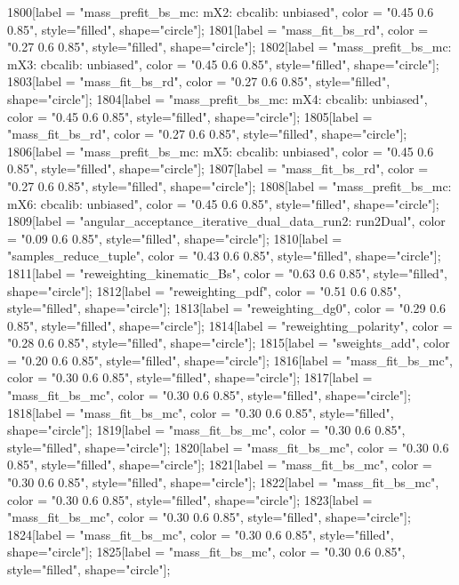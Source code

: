 {	1800[label = "mass_prefit_bs_mc\nmassbin: mX2\nmassmodel: cbcalib\ntrigger: unbiased", color = "0.45 0.6 0.85", style="filled", shape="circle"];
	1801[label = "mass_fit_bs_rd", color = "0.27 0.6 0.85", style="filled", shape="circle"];
	1802[label = "mass_prefit_bs_mc\nmassbin: mX3\nmassmodel: cbcalib\ntrigger: unbiased", color = "0.45 0.6 0.85", style="filled", shape="circle"];
	1803[label = "mass_fit_bs_rd", color = "0.27 0.6 0.85", style="filled", shape="circle"];
	1804[label = "mass_prefit_bs_mc\nmassbin: mX4\nmassmodel: cbcalib\ntrigger: unbiased", color = "0.45 0.6 0.85", style="filled", shape="circle"];
	1805[label = "mass_fit_bs_rd", color = "0.27 0.6 0.85", style="filled", shape="circle"];
	1806[label = "mass_prefit_bs_mc\nmassbin: mX5\nmassmodel: cbcalib\ntrigger: unbiased", color = "0.45 0.6 0.85", style="filled", shape="circle"];
	1807[label = "mass_fit_bs_rd", color = "0.27 0.6 0.85", style="filled", shape="circle"];
	1808[label = "mass_prefit_bs_mc\nmassbin: mX6\nmassmodel: cbcalib\ntrigger: unbiased", color = "0.45 0.6 0.85", style="filled", shape="circle"];
	1809[label = "angular_acceptance_iterative_dual_data_run2\nangacc: run2Dual", color = "0.09 0.6 0.85", style="filled", shape="circle"];
	1810[label = "samples_reduce_tuple", color = "0.43 0.6 0.85", style="filled", shape="circle"];
	1811[label = "reweighting_kinematic_Bs", color = "0.63 0.6 0.85", style="filled", shape="circle"];
	1812[label = "reweighting_pdf", color = "0.51 0.6 0.85", style="filled", shape="circle"];
	1813[label = "reweighting_dg0", color = "0.29 0.6 0.85", style="filled", shape="circle"];
	1814[label = "reweighting_polarity", color = "0.28 0.6 0.85", style="filled", shape="circle"];
	1815[label = "sweights_add", color = "0.20 0.6 0.85", style="filled", shape="circle"];
	1816[label = "mass_fit_bs_mc", color = "0.30 0.6 0.85", style="filled", shape="circle"];
	1817[label = "mass_fit_bs_mc", color = "0.30 0.6 0.85", style="filled", shape="circle"];
	1818[label = "mass_fit_bs_mc", color = "0.30 0.6 0.85", style="filled", shape="circle"];
	1819[label = "mass_fit_bs_mc", color = "0.30 0.6 0.85", style="filled", shape="circle"];
	1820[label = "mass_fit_bs_mc", color = "0.30 0.6 0.85", style="filled", shape="circle"];
	1821[label = "mass_fit_bs_mc", color = "0.30 0.6 0.85", style="filled", shape="circle"];
	1822[label = "mass_fit_bs_mc", color = "0.30 0.6 0.85", style="filled", shape="circle"];
	1823[label = "mass_fit_bs_mc", color = "0.30 0.6 0.85", style="filled", shape="circle"];
	1824[label = "mass_fit_bs_mc", color = "0.30 0.6 0.85", style="filled", shape="circle"];
	1825[label = "mass_fit_bs_mc", color = "0.30 0.6 0.85", style="filled", shape="circle"];
}

